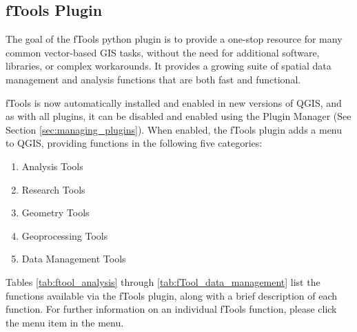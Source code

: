 
\subsection{fTools Plugin}\label{sec:ftools}


The goal of the fTools python plugin is to provide a one-stop resource for
many common vector-based GIS tasks, without the need for additional software, 
libraries, or complex workarounds. It provides a growing suite of spatial 
data management and analysis functions that are both fast and functional. 

fTools is now automatically installed and enabled in new versions of QGIS, and as with all plugins, it can 
be disabled and enabled using the Plugin Manager (See Section \ref{sec:managing_plugins}).
When enabled, the fTools plugin adds a  menu to QGIS, providing functions in the following 
five categories:

\begin{enumerate}
\item Analysis Tools
\item Research Tools
\item Geometry Tools
\item Geoprocessing Tools
\item Data Management Tools
\end{enumerate}

\label{ftool_functions}

Tables \ref{tab:ftool_analysis} through \ref{tab:fTool_data_management} list the functions available via the fTools plugin, along with a brief description of each function. For further information on an individual fTools function, please click the  menu item in the  menu.

